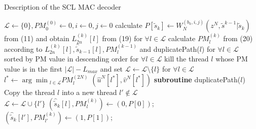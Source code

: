 \documentclass[conference]{IEEEtran}
\begin{document}
	\begin{algorithm}[htb]
		\renewcommand{\thealgocf}{1}
		\caption{Description of the SCL MAC decoder}  
		\LinesNumbered %
		$\mathcal{L}\gets{\lbrace0\rbrace},PM_{0}^{(0)}\gets{0},i\gets{0},j\gets{0}$\;
		{  
			calculate $P[\tilde{s}_k]\gets{W_N^{(b_k,i,j)}}(z^N,\tilde{s}^{k-1}|\tilde{s}_k)$ from (11) and obtain $L_{2n}^{(k)}[l]$ from (19) for $\forall{l}\in{\mathcal{L}}$\; 
			calculate $PM_l^{(k)}$ from (20) according to $L_{2n}^{(k)}[l], \hat{\tilde{s}}_{k-1}[l], PM_l^{(k-1)}$ and duplicatePath($l$) for  $\forall{l}\in{\mathcal{L}}$\; 
			{
			}
			sorted by PM value in descending order for  $\forall{l}\in{\mathcal{L}}$\; 
			{
				kill the thread $l$ whose PM value is in the first $|\mathcal{L}|-L_{max}$ and set $\mathcal{L}\gets{\mathcal{L}\setminus{\{l\}}}$ for $\forall{l}\in{\mathcal{L}}$\; 
			}
		} 
		$l^{*}\gets{\arg{\min{_{l\in{\mathcal{L}}}}PM_l^{(2N)}}}$\;
		\Return $(\hat{u}^{N}[l^*],\hat{v}^{N}[l^*])$\;
		\textbf{subroutine}
		{
			duplicatePath($l$)\;
			Copy the thread $l$ into a new thread $l'\notin{\mathcal{L}}$\\ 
			$\mathcal{L}\gets{\mathcal{L}\cup{\{l'\}}}$\;
			$(\hat{\tilde{s}}_k[l],PM_l^{(k)})\gets{(0,P[0])}$;\\ $(\hat{\tilde{s}}_k[l'],PM_{l'}^{(k)})\gets{(1,P[1])}$;
		}
		
	\end{algorithm}
\end{document}

